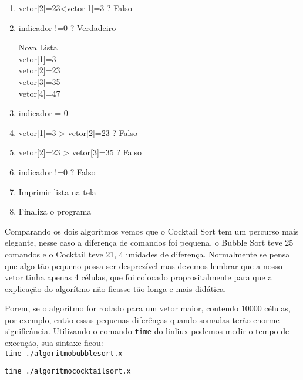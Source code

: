 \documentclass[11pts]{book}
\begin{document}
\begin{enumerate}
\item vetor[2]=23<vetor[1]=3 ? Falso

\item indicador !=0 ? Verdadeiro

 Nova Lista \\

vetor[1]=3 \\
vetor[2]=23\\
vetor[3]=35\\
vetor[4]=47 \\

\item indicador = 0

\item vetor[1]=3 > vetor[2]=23 ? Falso

\item vetor[2]=23 > vetor[3]=35 ? Falso

\item indicador !=0 ? Falso

\item Imprimir lista na tela 

\item Finaliza o programa

\end{enumerate}

Comparando os dois algorítmos vemos que o Cocktail Sort tem um percurso mais elegante, nesse caso a diferença de comandos foi pequena, o Bubble Sort teve 25 comandos e o Cocktail teve 21, 4 unidades de diferença. Normalmente se pensa que algo tão pequeno possa ser desprezível mas devemos lembrar que a nosso vetor tinha apenas 4 células, que foi colocado proprositalmente para que a explicação do algorítmo não ficasse tão longa e mais didática.

Porem, se o algorítmo for rodado para um vetor maior, contendo 10000 células, por exemplo, então essas pequenas diferênças quando somadas terão enorme significância. Utilizando o comando \texttt{time} do linliux podemos medir o tempo de execução, sua sintaxe ficou:\\

\texttt{time ./algoritmobubblesort.x}

\texttt{time ./algoritmococktailsort.x} 

\newpage
\end{document}
